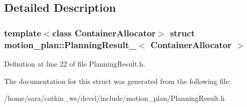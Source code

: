 \subsection{Detailed Description}
\subsubsection*{template$<$class Container\+Allocator$>$\newline
struct motion\+\_\+plan\+::\+Planning\+Result\+\_\+$<$ Container\+Allocator $>$}



Definition at line 22 of file Planning\+Result.\+h.



The documentation for this struct was generated from the following file\+:\begin{DoxyCompactItemize}
\item 
/home/sara/catkin\+\_\+ws/devel/include/motion\+\_\+plan/Planning\+Result.\+h\end{DoxyCompactItemize}

